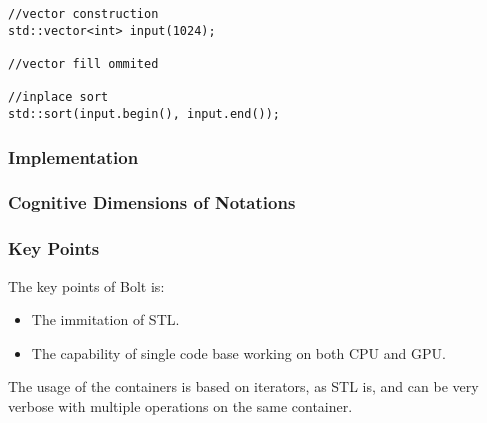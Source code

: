 \begin{lstlisting}[caption={STL sort example}, label={code:boltExample2}]
//vector construction
std::vector<int> input(1024);

//vector fill ommited

//inplace sort
std::sort(input.begin(), input.end());
\end{lstlisting}

\subsubsection{Implementation}

\subsubsection{Cognitive Dimensions of Notations}

\subsubsection{Key Points}
The key points of Bolt is:

\begin{itemize}
\item The immitation of STL.
\item The capability of single code base working on both CPU and GPU.
\end{itemize}

The usage of the containers is based on iterators, as STL is, and can be very verbose with multiple operations on the same container.
